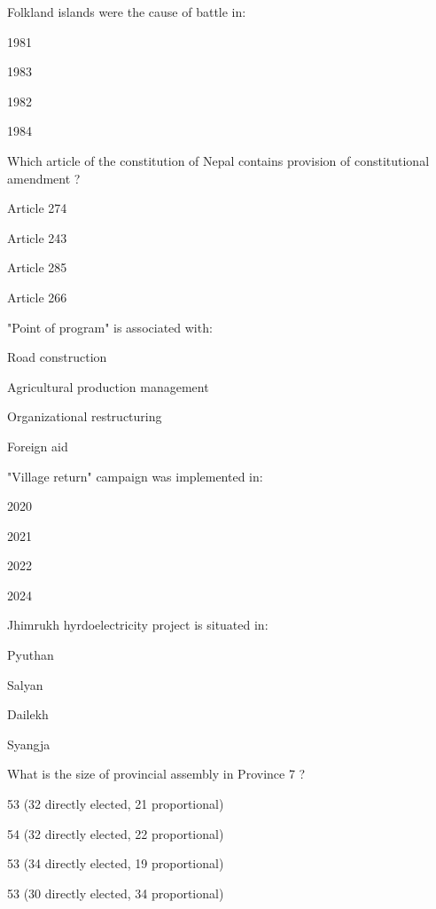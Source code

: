\begin{questions}
\question Folkland islands were the cause of battle in:
  \begin{items}
  \item* 1981
  \item 1983
  \item 1982
  \item 1984
  \end{items}

\question Which article of the constitution of Nepal contains provision of constitutional amendment ?
  \begin{items}
  \item* Article 274
  \item Article 243
  \item Article 285
  \item Article 266
  \end{items}

\question "Point of program" is associated with:
  \begin{items}
  \item Road construction
  \item Agricultural production management
  \item Organizational restructuring
  \item* Foreign aid
  \end{items}

\question "Village return" campaign was implemented in:
  \begin{items}
  \item 2020
  \item 2021
  \item 2022
  \item* 2024
  \end{items}

\question Jhimrukh hyrdoelectricity project is situated in:
  \begin{items}
  \item* Pyuthan
  \item Salyan
  \item Dailekh
  \item Syangja
  \end{items}

\question What is the size of provincial assembly in Province 7 ?
  \begin{items}
  \item* 53 (32 directly elected, 21 proportional)
  \item 54 (32 directly elected, 22 proportional)
  \item 53 (34 directly elected, 19 proportional)
  \item 53 (30 directly elected, 34 proportional)
  \end{items}


\end{questions}
